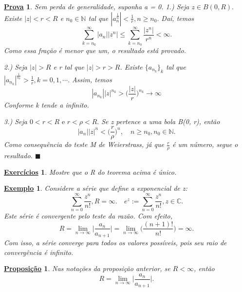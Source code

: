 \documentclass{article}
\newtheorem{example}{\underline{Exemplo}}[section]
\newtheorem*{proof*}{\underline{Prova}}
\newtheorem*{prop*}{\underline{Proposi\c c\~ao}}
\newtheorem*{exer*}{\underline{Exerc\'icios}}
\renewcommand\qedsymbol{$\blacksquare$}
\begin{document}
\begin{proof*}
  Sem perda de generalidade, suponha a = 0.
  1.) Seja $z\in{B(0, R)}.$ Existe $|z| < r < R$ e $n_0\in\mathbb{N}$ tal que $|a_n^{\frac{1}{n}}| < \frac{1}{r},
n\geq{n_0}.$ Da\'i, temos 
  $$
  \sum_{k=n_0}^{\infty}|a_n||z^n|\leq \sum_{k=n_0}^{\infty}\frac{|z^n|}{r^n} < \infty.
  $$
Como essa fra\c c\~ao \'e menor que um, o resultado est\'a provado.

  2.) Seja $|z| > R$ e r tal que $|z|> r > R$. Existe $\{a_{n_k}\}_k$ tal que $|a_{n_k}|^{\frac{1}{n_k}} > \frac{1}{r},
k = 0, 1, \cdots.$ Assim, temos
  $$
    |a_{n_k}||z|^{n_k} > \biggl(\frac{|z|}{r}\biggr)^{n_k}\to\infty
  $$
Conforme k tende a infinito.

  3.) Seja $0 < r < R \text{ e } r < \rho < R.$ Se z pertence a uma bola B(0, r), ent\~ao
  $$
    |a_n||z|^n < \biggl(\frac{r}{\rho}\biggr)^n, \quad n\geq{n_0}, n_0\in\mathbb{N}.
  $$
Como consequ\^encia do teste M de Weierstrass, j\'a que $\frac{r}{\rho}$ \'e um n\'umero, segue
o resultado.
\qedsymbol
\end{proof*}
\begin{exer*}
  Mostre que o R do teorema acima \'e \'unico.
\end{exer*}
\begin{example}
  Considere a s\'erie que define a exponencial de z:
  $$
  \sum_{n=0}^{\infty}\frac{z^n}{n!}, R = \infty.\quad e^z:=\sum_{n=0}^{\infty}\frac{z^n}{n!}, z\in\mathbb{C}.
  $$
  Este s\'erie \'e convergente pelo teste da raz\~ao. Com efeito, 
  $$
  R = \lim_{n\to\infty}\biggl|\frac{a_n}{a_{n+1}}\biggr| = \lim_{n\to\infty}\biggl(\frac{(n+1)!}{n!}\biggr) = \infty.
  $$
  Com isso, a s\'erie converge para todos os valores poss\'iveis, pois seu raio de converg\^encia
\'e infinito.
\end{example}
\begin{prop*}
  Nas nota\c c\~oes da proposi\c c\~ao anterior, se $R < \infty$, ent\~ao
  $$
    R = \lim_{n\to\infty}\biggl|\frac{a_n}{a_{n+1}}\biggr|.
  $$
\end{prop*}
\end{document}

